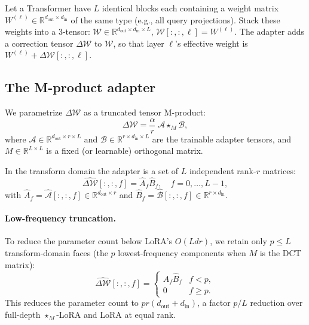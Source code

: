 \documentclass{article}
\newcommand{\R}{\mathbb{R}}
\newcommand{\cW}{\mathcal{W}}
\newcommand{\cA}{\mathcal{A}}
\newcommand{\cB}{\mathcal{B}}
\newcommand{\mprod}{\star_M}
\newcommand{\DeltaW}{\Delta\mathcal{W}}
\theoremstyle{plain}
\begin{document}
Let a Transformer have $L$ identical blocks each containing a weight matrix
$W^{(\ell)} \in \R^{d_{\mathrm{out}} \times d_{\mathrm{in}}}$ of the same type
(e.g., all query projections).
Stack these weights into a 3-tensor:
$\cW \in \R^{d_{\mathrm{out}} \times d_{\mathrm{in}} \times L}$,
$\cW[:,:,\ell] = W^{(\ell)}$.
The adapter adds a correction tensor $\DeltaW$ to $\cW$,
so that layer $\ell$'s effective weight is
$W^{(\ell)} + \DeltaW[:,:,\ell]$.

\subsection{The M-product adapter}
\label{sec:adapter}

We parametrize $\DeltaW$ as a truncated tensor M-product:
\begin{equation}
  \DeltaW = \frac{\alpha}{r}\; \cA \mprod \cB,
  \label{eq:adapter}
\end{equation}
where $\cA \in \R^{d_{\mathrm{out}} \times r \times L}$ and
$\cB \in \R^{r \times d_{\mathrm{in}} \times L}$ are the trainable adapter tensors,
and $M \in \R^{L \times L}$ is a fixed (or learnable) orthogonal matrix.

In the transform domain the adapter is a set of $L$ independent rank-$r$ matrices:
\begin{equation}
  \widehat{\DeltaW}[:,:,f] = \hat{A}_f \hat{B}_f, \quad f = 0, \dots, L-1,
\end{equation}
with $\hat{A}_f = \hat{\cA}[:,:,f] \in \R^{d_{\mathrm{out}} \times r}$
and $\hat{B}_f = \hat{\cB}[:,:,f] \in \R^{r \times d_{\mathrm{in}}}$.

\paragraph{Low-frequency truncation.}
To reduce the parameter count below LoRA's $O(Ldr)$, we retain only
$p \leq L$ transform-domain faces (the $p$ lowest-frequency components when
$M$ is the DCT matrix):
\begin{equation}
  \widehat{\DeltaW}[:,:,f] =
  \begin{cases}
    \hat{A}_f \hat{B}_f & f < p, \\
    0                    & f \geq p.
  \end{cases}
  \label{eq:truncation}
\end{equation}
This reduces the parameter count to $pr(d_{\mathrm{out}} + d_{\mathrm{in}})$,
a factor $p/L$ reduction over full-depth $\star_M$-LoRA and LoRA at equal rank.
\end{document}
